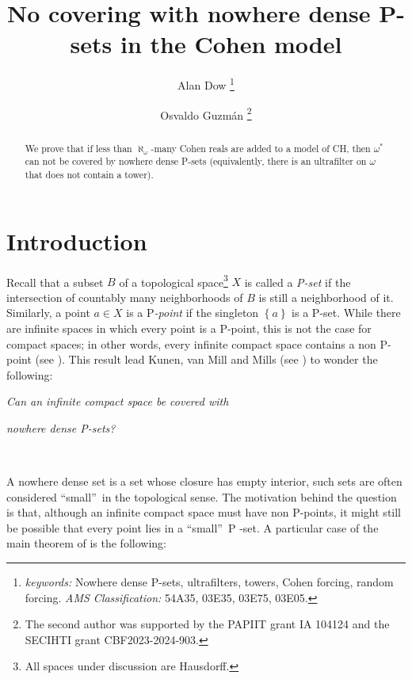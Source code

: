 \documentclass{article}%
\begin{document}
\date{}
\title{No covering with nowhere dense \textsf{P}-sets in the Cohen model}
\author{Alan Dow \thanks{\textit{keywords:} Nowhere dense P-sets, ultrafilters,
towers, Cohen forcing, random forcing. \newline\textit{AMS Classification:}
54A35, 03E35, 03E75, 03E05.}
\and Osvaldo Guzm\'{a}n \thanks{The second author was supported by the PAPIIT grant
IA 104124 and the SECIHTI grant CBF2023-2024-903.}}
\maketitle

\begin{abstract}
We prove that if less than $\aleph_{\omega}$-many Cohen reals are added to a
model of \textsf{CH}, then $\omega^{\ast}$ can not be covered by nowhere dense
\textsf{P}-sets (equivalently, there is an ultrafilter on $\omega$ that does
not contain a tower).

\end{abstract}

\section{Introduction}

Recall that a subset $B$ of a topological space\footnote{All spaces under
discussion are Hausdorff.} $X$ is called a \emph{P-set }if the intersection of
countably many neighborhoods of $B$ is still a neighborhood of it. Similarly,
a point $a\in X$ is a \textsf{P}\emph{-point }if the singleton $\left\{
a\right\}  $ is a \textsf{P}-set. While there are infinite spaces in which
every point is a \textsf{P}-point, this is not the case for compact spaces; in
other words, every infinite compact space contains a non \textsf{P}-point (see
\cite{ConcerningRingsofFunctions}). This result lead Kunen, van Mill and Mills
(see \cite{NowhereDenseClosedPsets}) to wonder the following:\qquad
\qquad\ \ \ \ \qquad\qquad\ \ \ 

\begin{center}
\textit{Can an infinite compact space be covered with}

\textit{nowhere dense \emph{P-}sets?}

\qquad\qquad\ \ \ \ \ \qquad\qquad\qquad
\end{center}

A nowhere dense set is a set whose closure has empty interior, such sets are
often considered \textquotedblleft small\textquotedblright\ in the topological
sense. The motivation behind the question is that, although an infinite
compact space must have non \textsf{P}-points, it might still be possible that
every point lies in a \textquotedblleft small\textquotedblright\ \textsf{P}%
-set. A particular case of the main theorem of \cite{NowhereDenseClosedPsets}
is the following:
\end{document}
